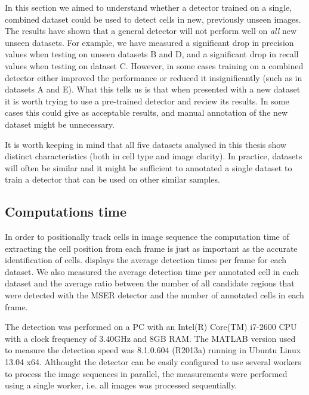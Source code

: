 		In this section we aimed to understand whether a detector trained on a single, combined dataset could be used to detect cells in new, previously unseen images. The results have shown that a general detector will not perform well on \textit{all} new unseen datasets. For example, we have measured a significant drop in precision values when testing on unseen datasets B and D, and a significant drop in recall values when testing on dataset C. However, in some cases training on a combined detector either improved the performance or reduced it insignificantly (such as in datasets A and E). What this tells us is that when presented with a new dataset it is worth trying to use a pre-trained detector and review its results. In some cases this could give as acceptable results, and manual annotation of the new dataset might be unnecessary.
		
		It is worth keeping in mind that all five datasets analysed in this thesis show distinct characteristics (both in cell type and image clarity). In practice, datasets will often be similar and it might be sufficient to annotated a single dataset to train a detector that can be used on other similar samples.
	
	\subsection{Computations time}
	
		In order to positionally track cells in image sequence the computation time of extracting the cell position from each frame is just as important as the accurate identification of cells.  displays the average detection times per frame for each dataset. We also measured the average detection time per annotated cell in each dataset and the average ratio between the number of all candidate regions that were detected with the MSER detector and the number of annotated cells in each frame.
		
		The detection was performed on a PC with an Intel(R) Core(TM) i7-2600 CPU with a clock frequency of 3.40GHz and 8GB RAM. The MATLAB version used to measure the detection speed was 8.1.0.604 (R2013a) running in Ubuntu Linux 13.04 x64. Althought the detector can be easily configured to use several workers to process the image sequences in parallel, the measurements were performed using a single worker, i.e. all images was processed sequentially.
		
